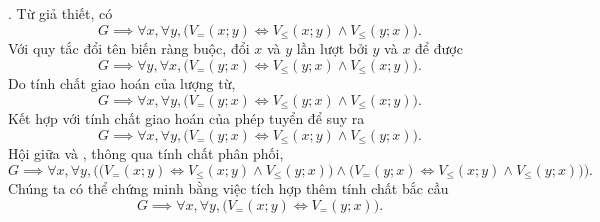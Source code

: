 . Từ giả thiết, có
\begin{equation}
    G \implies \forall x, \forall y, \big(V_=(x; y) \iff V_\le(x; y) \land V_\le(y; x)\big).
    \label{eq:nen_tang_lo_gich:giai_tich_vi_tu_bac_nhat:quy_tac_suy_luan:2.1}
\end{equation}
Với quy tắc đổi tên biến ràng buộc, đổi $x$ và $y$ lần lượt bởi $y$ và $x$ để được
\begin{equation*}
    G \implies \forall y, \forall x, \big(V_=(y; x) \iff V_\le(y; x) \land V_\le(x; y)\big).
\end{equation*}
Do tính chất giao hoán của lượng từ,
\begin{equation*}
    G \implies \forall x, \forall y, \big(V_=(y; x) \iff V_\le(y; x) \land V_\le(x; y)\big).
\end{equation*}
Kết hợp với tính chất giao hoán của phép tuyển để suy ra
\begin{equation}
    G \implies \forall x, \forall y, \big(V_=(y; x) \iff V_\le(x; y) \land V_\le(y; x)\big).
    \label{eq:nen_tang_lo_gich:giai_tich_vi_tu_bac_nhat:quy_tac_suy_luan:2.2}
\end{equation}
Hội giữa  và , thông qua tính chất phân phối,
\begin{equation*}
   G \implies \forall x, \forall y, \Big(\big(V_=(x; y) \iff V_\le(x; y) \land V_\le(y; x)\big) \land \big(V_=(y; x) \iff V_\le(x; y) \land V_\le(y; x)\big)\Big).
\end{equation*}
Chúng ta có thể chứng minh bằng việc tích hợp thêm tính chất bắc cầu
\begin{equation*}
   G \implies \forall x, \forall y, \big(V_=(x; y) \iff V_=(y; x)\big).
\end{equation*}

